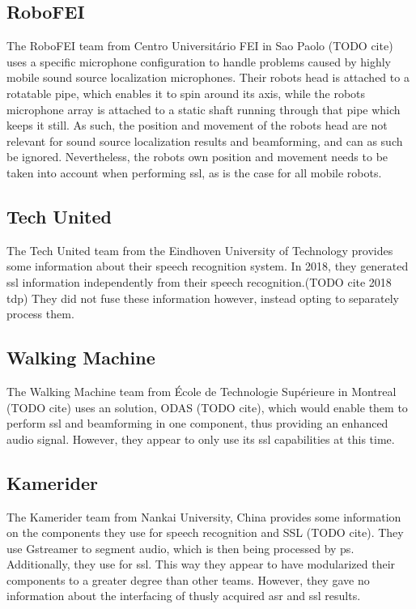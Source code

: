 \subsection{RoboFEI}
The RoboFEI team from Centro Universitário FEI in Sao Paolo (TODO cite) uses a specific microphone configuration to handle problems caused by highly mobile sound source localization microphones.
Their robots head is attached to a rotatable pipe, which enables it to spin around its axis, while the robots microphone array is attached to a static shaft running through that pipe which keeps it still.
As such, the position and movement of the robots head are not relevant for sound source localization results and beamforming, and can as such be ignored.
Nevertheless, the robots own position and movement needs to be taken into account when performing \gls{ssl}, as is the case for all mobile robots.

\subsection{Tech United}
The Tech United team from the Eindhoven University of Technology provides some information about their speech recognition system.
In 2018, they generated \gls{ssl} information independently from their speech recognition.(TODO cite 2018 tdp)
They did not fuse these information however, instead opting to separately process them. %


\subsection{Walking Machine}
The Walking Machine team from École de Technologie Supérieure in Montreal (TODO cite) uses an solution, ODAS (TODO cite), which would enable them to perform \gls{ssl} and beamforming in one component, thus providing an enhanced audio signal.
However, they appear to only use its \gls{ssl} capabilities at this time.


\subsection{Kamerider}
The Kamerider team from Nankai University, China provides some information on the components they use for speech recognition and SSL (TODO cite).
They use Gstreamer to segment audio, which is then being processed by \gls{ps}.
Additionally, they use \HARK for \gls{ssl}.
This way they appear to have modularized their components to a greater degree than other teams.
However, they gave no information about the interfacing of thusly acquired \gls{asr} and \gls{ssl} results.


